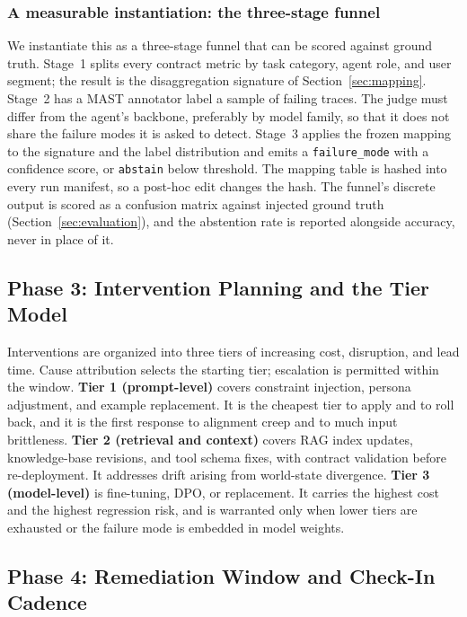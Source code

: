 \documentclass[conference]{IEEEtran}
\newcommand{\code}[1]{\texttt{\small #1}}
\begin{document}
\subsubsection{A measurable instantiation: the three-stage funnel}
\label{sec:funnel}
We instantiate this as a three-stage funnel that can be scored against
ground truth. Stage~1 splits every contract metric by task category, agent
role, and user segment; the result is the disaggregation signature of
Section~\ref{sec:mapping}. Stage~2 has a MAST annotator \cite{cemri2025} label
a sample of failing traces. The judge must differ from the agent's backbone,
preferably by model family, so that it does not share the failure modes it is
asked to detect. Stage~3 applies the frozen mapping to the signature and the
label distribution and emits a \code{failure\_mode} with a confidence score,
or \code{abstain} below threshold. The mapping table is hashed into every run
manifest, so a post-hoc edit changes the hash. The funnel's discrete output is scored as a confusion matrix
against injected ground truth (Section~\ref{sec:evaluation}), and the
abstention rate is reported alongside accuracy, never in place of it.

\subsection{Phase 3: Intervention Planning and the Tier Model}

Interventions are organized into three tiers of increasing cost, disruption,
and lead time. Cause attribution selects the starting tier; escalation is
permitted within the window. \textbf{Tier 1 (prompt-level)} covers constraint
injection, persona adjustment, and example replacement. It is the cheapest tier
to apply and to roll back, and it is the first response to alignment creep and
to much input brittleness. \textbf{Tier 2 (retrieval and context)} covers RAG
index updates, knowledge-base revisions, and tool schema fixes, with contract
validation before re-deployment. It addresses drift arising from world-state
divergence.
\textbf{Tier 3 (model-level)} is fine-tuning, DPO, or replacement. It carries
the highest cost and the highest regression risk, and is warranted only when
lower tiers are exhausted or the failure mode is embedded in model weights.

\subsection{Phase 4: Remediation Window and Check-In Cadence}
\end{document}
